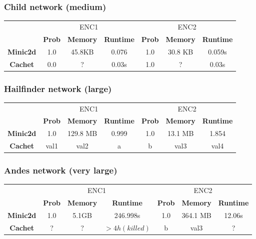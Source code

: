 \subsubsection{Child network (medium)}
\begin{table}[H]
    \centering
    \begin{tabular}{c|c|c|c|c|c|c|}
    \cline{2-7}
            & \multicolumn{3}{c|}{ENC1} & \multicolumn{3}{c|}{ENC2} \\ \cline{2-7}
      & \textbf{Prob}  & \textbf{Memory}  & \textbf{Runtime} & \textbf{Prob}  & \textbf{Memory}  & \textbf{Runtime} \\ \cline{1-7}
      \textbf{Minic2d} & 1.0  & 45.8KB    & 0.076   & 1.0    & 30.8 KB    & 	0.059s \\
      \hline
    \textbf{Cachet}  & 0.0  & ?    & 0.03s      & 1.0     & ?    & 0.03s    \\ \cline{1-7}
    \end{tabular}
\end{table}

\subsubsection{Hailfinder network (large)}
\begin{table}[H]
    \centering
    \begin{tabular}{c|c|c|c|c|c|c|}
    \cline{2-7}
            & \multicolumn{3}{c|}{ENC1} & \multicolumn{3}{c|}{ENC2} \\ \cline{2-7}
      & \textbf{Prob}  & \textbf{Memory}  & \textbf{Runtime} & \textbf{Prob}  & \textbf{Memory}  & \textbf{Runtime} \\ \cline{1-7}
      \textbf{Minic2d} & 1.0  & 129.8 MB & 0.999   & 1.0    & 13.1 MB    & 	1.854 \\
      \hline
    \textbf{Cachet}  & val1  & val2    & a       & b     & val3    & val4    \\ \cline{1-7}
    \end{tabular}
\end{table}

\subsubsection{Andes network (very large)}
\begin{table}[H]
    \centering
    \begin{tabular}{c|c|c|c|c|c|c|}
    \cline{2-7}
            & \multicolumn{3}{c|}{ENC1} & \multicolumn{3}{c|}{ENC2} \\ \cline{2-7}
      & \textbf{Prob}  & \textbf{Memory}  & \textbf{Runtime} & \textbf{Prob}  & \textbf{Memory}  & \textbf{Runtime} \\ \cline{1-7}
      \textbf{Minic2d} & 1.0  & 5.1GB    & 246.998s   & 1.0    & 364.1 MB    & 	12.06s \\
      \hline
    \textbf{Cachet}  & ?  & ?    & $> 4h (killed)$      & b     & val3    & ?    \\ \cline{1-7}
    \end{tabular}
\end{table}

